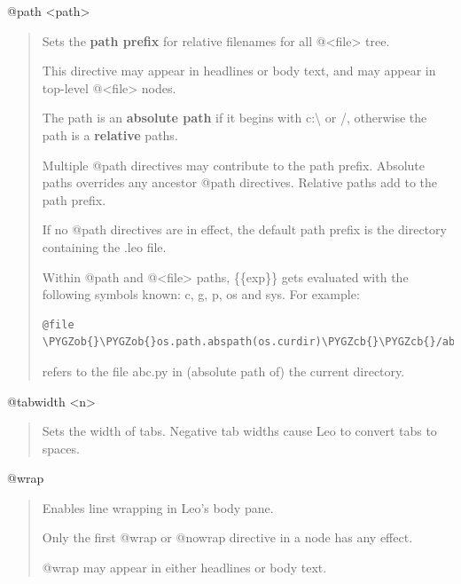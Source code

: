 \documentclass[a4paper,10pt,english]{sphinxmanual}
\def\PYGZob{\char`\{}
\def\PYGZcb{\char`\}}
\begin{document}
@path \textless{}path\textgreater{}
\begin{quote}

Sets the \textbf{path prefix} for relative filenames for all @\textless{}file\textgreater{} tree.

This directive may appear in headlines or body text, and may
appear in top-level @\textless{}file\textgreater{} nodes.

The path is an \textbf{absolute path} if it begins with c:\textbackslash{} or /,
otherwise the path is a \textbf{relative} paths.

Multiple @path directives may contribute to the path prefix.
Absolute paths overrides any ancestor @path directives.
Relative paths add to the path prefix.

If no @path directives are in effect, the default path prefix is
the directory containing the .leo file.

Within @path and @\textless{}file\textgreater{} paths, \{\{exp\}\} gets evaluated with the following
symbols known: c, g, p, os and sys.  For example:

\begin{Verbatim}[commandchars=\\\{\}]
@file \PYGZob{}\PYGZob{}os.path.abspath(os.curdir)\PYGZcb{}\PYGZcb{}/abc.py
\end{Verbatim}

refers to the file abc.py in (absolute path of) the current directory.
\end{quote}

@tabwidth \textless{}n\textgreater{}
\begin{quote}

Sets the width of tabs.
Negative tab widths cause Leo to convert tabs to spaces.
\end{quote}

@wrap
\begin{quote}

Enables line wrapping in Leo's body pane.

Only the first @wrap or @nowrap directive in a node has any effect.

@wrap may appear in either headlines or body text.
\end{quote}
\end{document}
